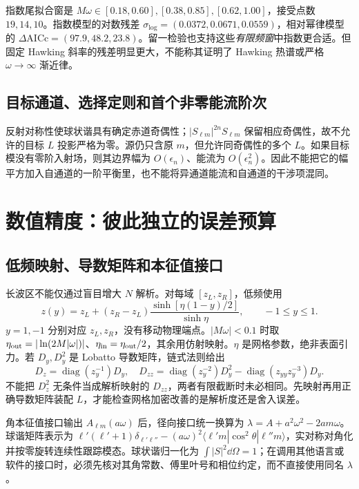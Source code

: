 指数尾拟合窗是 $M\omega\in[0.18,0.60],[0.38,0.85],[0.62,1.00]$，接受点数 $19,14,10$。指数模型的对数残差 $\sigma_{\log}=(0.0372,0.0671,0.0559)$，相对幂律模型的 $\Delta\mathrm{AICc}=(97.9,48.2,23.8)$。留一检验也支持这些\emph{有限频窗}中指数更合适。但固定 Hawking 斜率的残差明显更大，不能称其证明了 Hawking 热谱或严格 $\omega\to\infty$ 渐近律。

\subsection{目标通道、选择定则和首个非零能流阶次}
反射对称性使球状谐具有确定赤道奇偶性；$|S_{\ell m}|^{2n}S_{\ell m}$ 保留相应奇偶性，故不允许的目标 $L$ 投影严格为零。源仍只含原 $m$，但允许同奇偶性的多个 $L$。如果目标模没有零阶入射场，则其边界幅为 $O(\epsilon_n)$、能流为 $O(\epsilon_n^2)$。因此不能把它的幅平方加入自通道的一阶平衡里，也不能将异通道能流和自通道的干涉项混同。

\section{数值精度：彼此独立的误差预算}
\subsection{低频映射、导数矩阵和本征值接口}
长波区不能仅通过盲目增大 $N$ 解析。对每域 $[z_L,z_R]$，低频使用
\begin{equation}
 z(y)=z_L+(z_R-z_L)\frac{\sinh[\eta(1-y)/2]}{\sinh\eta},\qquad -1\le y\le1.
\end{equation}
$y=1,-1$ 分别对应 $z_L,z_R$，没有移动物理端点。$|M\omega|<0.1$ 时取 $\eta_{\rm out}=|\ln(2M|\omega|)|$、$\eta_{\rm in}=\eta_{\rm out}/2$，其余用仿射映射。$\eta$ 是网格参数，绝非表面引力。若 $D_y,D_y^2$ 是 Lobatto 导数矩阵，链式法则给出
\begin{equation}
 D_z=\operatorname{diag}(z_y^{-1})D_y,\quad
 D_{zz}=\operatorname{diag}(z_y^{-2})D_y^2
 -\operatorname{diag}(z_{yy}z_y^{-3})D_y.
\end{equation}
不能把 $D_z^2$ 无条件当成解析映射的 $D_{zz}$，两者有限截断时未必相同。先映射再用正确导数矩阵装配 $L$，才能检查网格加密改善的是解析度还是舍入误差。

角本征值接口输出 $A_{\ell m}(a\omega)$ 后，径向接口统一换算为 $\lambda=A+a^2\omega^2-2am\omega$。球谐矩阵表示为 $\ell'(\ell'+1)\delta_{\ell'\ell''}-(a\omega)^2\langle\ell'm|\cos^2\theta|\ell''m\rangle$，实对称对角化并按零旋转连续性跟踪模态。球状谐归一化为 $\int|S|^2\dd\Omega=1$；在调用其他语言或软件的接口时，必须先核对其角常数、傅里叶号和相位约定，而不直接使用同名 $\lambda$。

